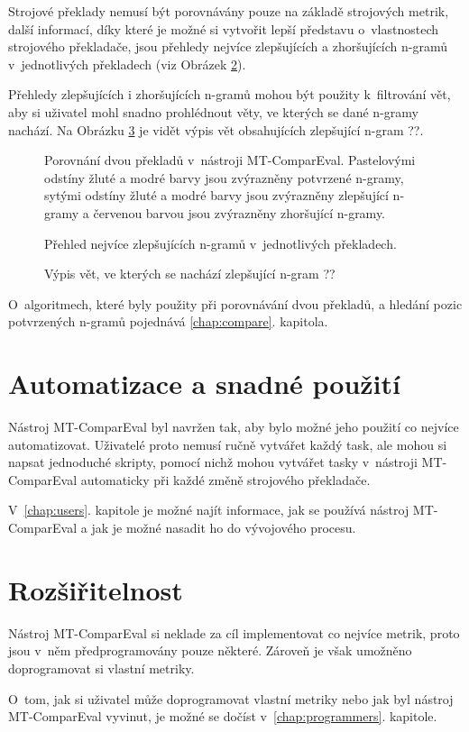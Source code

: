 Strojové překlady nemusí být porovnávány pouze na základě strojových metrik,
  další informací,
  díky které je možné si vytvořit lepší představu o~vlastnostech strojového překladače,
  jsou přehledy nejvíce zlepšujících a zhoršujících \mbox{n-gramů} v~jednotlivých překladech (viz Obrázek \ref{img:confirmed_ngrams}).

Přehledy zlepšujících i zhoršujících \mbox{n-gramů} mohou být použity k~filtrování vět,
  aby si uživatel mohl snadno prohlédnout věty,
  ve kterých se dané \mbox{n-gramy} nachází.
Na Obrázku \ref{img:filtered_sentences} je vidět výpis vět obsahujících zlepšující \mbox{n-gram} ??.

\begin{figure}
	\caption{
		Porovnání dvou překladů v~nástroji \mbox{MT-ComparEval}.
		Pastelovými odstíny žluté a modré barvy jsou zvýrazněny potvrzené \mbox{n-gramy},
		sytými odstíny žluté a modré barvy jsou zvýrazněny zlepšující \mbox{n-gramy}
		a červenou barvou jsou zvýrazněny zhoršující \mbox{n-gramy}.
	}
	\label{img:compare_sentences}
\end{figure}

\begin{figure}
	\caption{Přehled nejvíce zlepšujících \mbox{n-gramů} v~jednotlivých překladech.}
	\label{img:confirmed_ngrams}
\end{figure}

\begin{figure}
	\caption{Výpis vět, ve kterých se nachází zlepšující \mbox{n-gram} ??}
	\label{img:filtered_sentences}
\end{figure}

O~algoritmech,
  které byly použity při porovnávání dvou překladů,
  a hledání pozic potvrzených \mbox{n-gramů}
  pojednává \ref{chap:compare}. kapitola.


\section{Automatizace a snadné použití}
Nástroj \mbox{MT-ComparEval} byl navržen tak,
  aby bylo možné jeho použití co nejvíce automatizovat.
Uživatelé proto nemusí ručně vytvářet každý task,
  ale mohou si napsat jednoduché skripty,
  pomocí nichž mohou vytvářet tasky v~nástroji \mbox{MT-ComparEval} automaticky při každé změně strojového překladače.

V~\ref{chap:users}. kapitole je možné najít informace,
  jak se používá nástroj \mbox{MT-ComparEval}
  a jak je možné nasadit ho do vývojového procesu.

\section{Rozšiřitelnost}
Nástroj \mbox{MT-ComparEval} si neklade za cíl implementovat co nejvíce metrik,
  proto jsou v~něm předprogramovány pouze některé.
Zároveň je však umožněno doprogramovat si vlastní metriky.

O~tom, jak si uživatel může doprogramovat vlastní metriky nebo jak byl nástroj \mbox{MT-ComparEval} vyvinut,
  je možné se dočíst v~\ref{chap:programmers}. kapitole.

